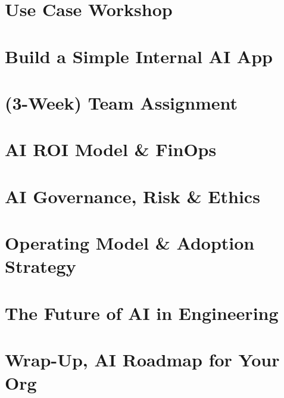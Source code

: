 \section[UseCase]{Use Case Workshop}


\section[BuildApp]{Build a Simple Internal AI App}


\section[TeamAssign]{(3-Week) Team Assignment}


\section[ROI]{AI ROI Model \& FinOps}


\section[Governance]{AI Governance, Risk \& Ethics}


\section[Operating]{Operating Model \& Adoption Strategy}


\section[Future]{The Future of AI in Engineering}


\section[WrapUp]{Wrap-Up, AI Roadmap for Your Org}


